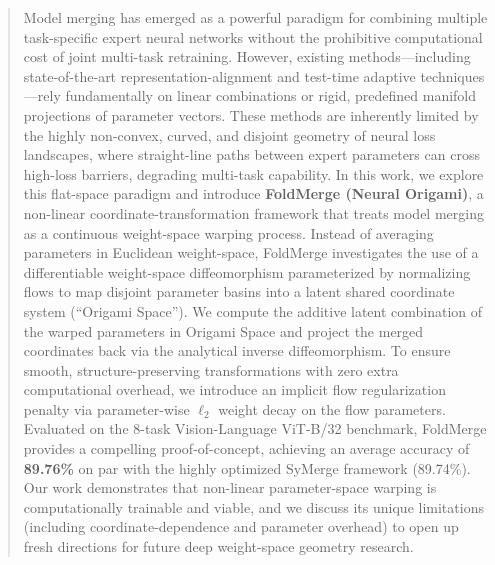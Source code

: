 \begin{abstract}
Model merging has emerged as a powerful paradigm for combining multiple task-specific expert neural networks without the prohibitive computational cost of joint multi-task retraining. 
However, existing methods—including state-of-the-art representation-alignment and test-time adaptive techniques—rely fundamentally on linear combinations or rigid, predefined manifold projections of parameter vectors. 
These methods are inherently limited by the highly non-convex, curved, and disjoint geometry of neural loss landscapes, where straight-line paths between expert parameters can cross high-loss barriers, degrading multi-task capability. 
In this work, we explore this flat-space paradigm and introduce \textbf{FoldMerge (Neural Origami)}, a non-linear coordinate-transformation framework that treats model merging as a continuous weight-space warping process. 
Instead of averaging parameters in Euclidean weight-space, FoldMerge investigates the use of a differentiable weight-space diffeomorphism parameterized by normalizing flows to map disjoint parameter basins into a latent shared coordinate system (``Origami Space''). 
We compute the additive latent combination of the warped parameters in Origami Space and project the merged coordinates back via the analytical inverse diffeomorphism. 
To ensure smooth, structure-preserving transformations with zero extra computational overhead, we introduce an implicit flow regularization penalty via parameter-wise $\ell_2$ weight decay on the flow parameters. 
Evaluated on the 8-task Vision-Language ViT-B/32 benchmark, FoldMerge provides a compelling proof-of-concept, achieving an average accuracy of \textbf{89.76\%} on par with the highly optimized SyMerge framework (89.74\%). 
Our work demonstrates that non-linear parameter-space warping is computationally trainable and viable, and we discuss its unique limitations (including coordinate-dependence and parameter overhead) to open up fresh directions for future deep weight-space geometry research.
\end{abstract}
